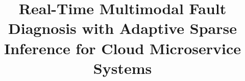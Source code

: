 \documentclass[conference]{IEEEtran}
\begin{document}
\title{Real-Time Multimodal Fault Diagnosis with Adaptive Sparse Inference for Cloud Microservice Systems}

\author{}

\maketitle











\end{document}
